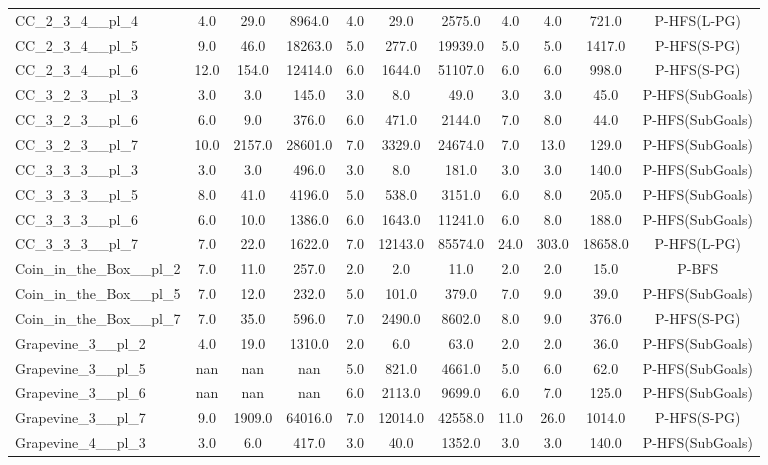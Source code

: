 \begin{table}[!ht]
\begin{tabular}{l|ccc|ccc|cccc}
CC\_2\_3\_4\_\_pl\_4 & 4.0 & 29.0 & 8964.0 & 4.0 & 29.0 & 2575.0 & 4.0 & 4.0 & 721.0 & P-HFS(L-PG) \\
CC\_2\_3\_4\_\_pl\_5 & 9.0 & 46.0 & 18263.0 & 5.0 & 277.0 & 19939.0 & 5.0 & 5.0 & 1417.0 & P-HFS(S-PG) \\
CC\_2\_3\_4\_\_pl\_6 & 12.0 & 154.0 & 12414.0 & 6.0 & 1644.0 & 51107.0 & 6.0 & 6.0 & 998.0 & P-HFS(S-PG) \\
CC\_3\_2\_3\_\_pl\_3 & 3.0 & 3.0 & 145.0 & 3.0 & 8.0 & 49.0 & 3.0 & 3.0 & 45.0 & P-HFS(SubGoals) \\
CC\_3\_2\_3\_\_pl\_6 & 6.0 & 9.0 & 376.0 & 6.0 & 471.0 & 2144.0 & 7.0 & 8.0 & 44.0 & P-HFS(SubGoals) \\
CC\_3\_2\_3\_\_pl\_7 & 10.0 & 2157.0 & 28601.0 & 7.0 & 3329.0 & 24674.0 & 7.0 & 13.0 & 129.0 & P-HFS(SubGoals) \\
CC\_3\_3\_3\_\_pl\_3 & 3.0 & 3.0 & 496.0 & 3.0 & 8.0 & 181.0 & 3.0 & 3.0 & 140.0 & P-HFS(SubGoals) \\
CC\_3\_3\_3\_\_pl\_5 & 8.0 & 41.0 & 4196.0 & 5.0 & 538.0 & 3151.0 & 6.0 & 8.0 & 205.0 & P-HFS(SubGoals) \\
CC\_3\_3\_3\_\_pl\_6 & 6.0 & 10.0 & 1386.0 & 6.0 & 1643.0 & 11241.0 & 6.0 & 8.0 & 188.0 & P-HFS(SubGoals) \\
CC\_3\_3\_3\_\_pl\_7 & 7.0 & 22.0 & 1622.0 & 7.0 & 12143.0 & 85574.0 & 24.0 & 303.0 & 18658.0 & P-HFS(L-PG) \\
Coin\_in\_the\_Box\_\_pl\_2 & 7.0 & 11.0 & 257.0 & 2.0 & 2.0 & 11.0 & 2.0 & 2.0 & 15.0 & P-BFS \\
Coin\_in\_the\_Box\_\_pl\_5 & 7.0 & 12.0 & 232.0 & 5.0 & 101.0 & 379.0 & 7.0 & 9.0 & 39.0 & P-HFS(SubGoals) \\
Coin\_in\_the\_Box\_\_pl\_7 & 7.0 & 35.0 & 596.0 & 7.0 & 2490.0 & 8602.0 & 8.0 & 9.0 & 376.0 & P-HFS(S-PG) \\
Grapevine\_3\_\_pl\_2 & 4.0 & 19.0 & 1310.0 & 2.0 & 6.0 & 63.0 & 2.0 & 2.0 & 36.0 & P-HFS(SubGoals) \\
Grapevine\_3\_\_pl\_5 & nan & nan & nan & 5.0 & 821.0 & 4661.0 & 5.0 & 6.0 & 62.0 & P-HFS(SubGoals) \\
Grapevine\_3\_\_pl\_6 & nan & nan & nan & 6.0 & 2113.0 & 9699.0 & 6.0 & 7.0 & 125.0 & P-HFS(SubGoals) \\
Grapevine\_3\_\_pl\_7 & 9.0 & 1909.0 & 64016.0 & 7.0 & 12014.0 & 42558.0 & 11.0 & 26.0 & 1014.0 & P-HFS(S-PG) \\
Grapevine\_4\_\_pl\_3 & 3.0 & 6.0 & 417.0 & 3.0 & 40.0 & 1352.0 & 3.0 & 3.0 & 140.0 & P-HFS(SubGoals) \\

\end{tabular}
\end{table}
